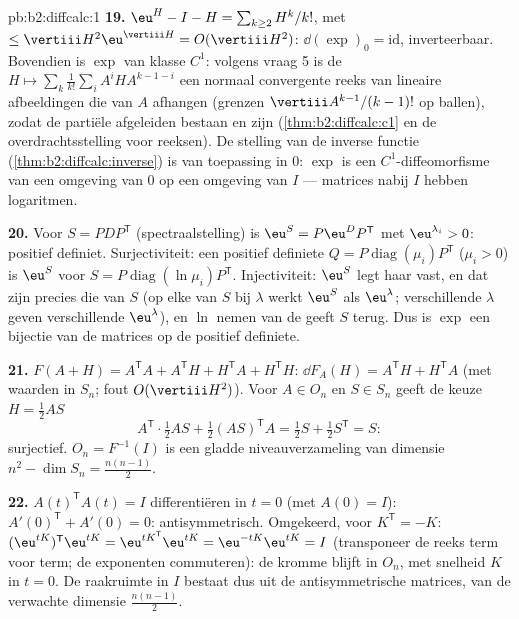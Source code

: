 \begin{solution}{pb:b2:diffcalc:1}
\textbf{19.} $\eu^H - I - H = \sum_{k\geq2}H^k/k!$, met  $\leq
\vertiii H^2\eu^{\vertiii H} = O(\vertiii H^2)$: $\dd(\exp)_0 =
\mathrm{id}$, inverteerbaar. Bovendien is $\exp$ van klasse $C^1$:
volgens vraag 5 is de  $H \mapsto
\sum_k\frac1{k!}\sum_iA^iHA^{k-1-i}$ een normaal convergente reeks
van lineaire afbeeldingen die  van $A$ afhangen (grenzen
$\vertiii A^{k-1}/(k-1)!$ op ballen), zodat de partiële afgeleiden
bestaan en  zijn (\cref{thm:b2:diffcalc:c1} en de
overdrachtsstelling voor reeksen). De stelling van de inverse
functie (\cref{thm:b2:diffcalc:inverse}) is van toepassing in $0$:
$\exp$ is een $C^1$-diffeomorfisme van een omgeving van $0$ op een
omgeving van $I$ --- matrices nabij $I$ hebben logaritmen.

\textbf{20.} Voor  $S = PDP^{\mathsf T}$
(spectraalstelling) is $\eu^S = P\eu^DP^{\mathsf T}$ 
met  $\eu^{\lambda_i} > 0$: positief definiet.
Surjectiviteit: een positief definiete $Q =
P\operatorname{diag}(\mu_i)P^{\mathsf T}$ ($\mu_i > 0$) is $\eu^S$
voor $S = P\operatorname{diag}(\ln\mu_i)P^{\mathsf T}$.
Injectiviteit: $\eu^S$ legt haar  vast, en dat zijn
precies die van $S$ (op elke  van $S$ bij $\lambda$
werkt $\eu^S$ als $\eu^\lambda$; verschillende $\lambda$ geven
verschillende $\eu^\lambda$), en $\ln$ nemen van de 
geeft $S$ terug. Dus is $\exp$ een bijectie van de 
matrices op de positief definiete.

\textbf{21.} $F(A + H) = A^{\mathsf T}A + A^{\mathsf T}H +
H^{\mathsf T}A + H^{\mathsf T}H$: $\dd F_A(H) = A^{\mathsf T}H +
H^{\mathsf T}A$ (met waarden in $S_n$; fout $O(\vertiii H^2)$).
Voor $A \in O_n$ en $S \in S_n$ geeft de keuze $H = \frac12AS$
\[
A^{\mathsf T}\cdot\tfrac12AS + \tfrac12(AS)^{\mathsf T}A
= \tfrac12 S + \tfrac12 S^{\mathsf T} = S :
\]
surjectief. $O_n = F^{-1}(I)$ is een gladde niveauverzameling van
dimensie $n^2 - \dim S_n = \frac{n(n-1)}2$.

\textbf{22.} $A(t)^{\mathsf T}A(t) = I$ differentiëren in $t = 0$
(met $A(0) = I$): $A'(0)^{\mathsf T} + A'(0) = 0$: antisymmetrisch.
Omgekeerd, voor $K^{\mathsf T} = -K$: $(\eu^{tK})^{\mathsf
T}\eu^{tK} = \eu^{tK^{\mathsf T}}\eu^{tK} = \eu^{-tK}\eu^{tK} = I$
(transponeer de reeks term voor term; de exponenten commuteren): de
kromme blijft in $O_n$, met snelheid $K$ in $t = 0$. De raakruimte
in $I$ bestaat dus uit de antisymmetrische matrices, van de
verwachte dimensie $\frac{n(n-1)}2$.


\end{solution}
